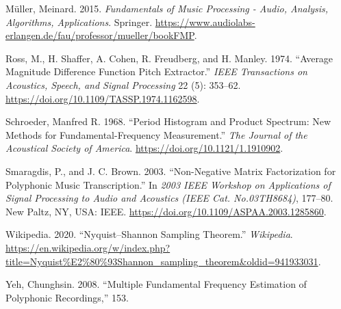 \documentclass[
  american,
]{article}
\newlength{\cslhangindent}
\newenvironment{cslreferences}%
  {\setlength{\parindent}{0pt}%
  \everypar{\setlength{\hangindent}{\cslhangindent}}\ignorespaces}%
  {\par}
\begin{document}
\begin{cslreferences}
\leavevmode\hypertarget{ref-muller_2015}{}%
Müller, Meinard. 2015. \emph{Fundamentals of Music Processing - Audio, Analysis, Algorithms, Applications}. Springer. \url{https://www.audiolabs-erlangen.de/fau/professor/mueller/bookFMP}.

\leavevmode\hypertarget{ref-ross_average_1974}{}%
Ross, M., H. Shaffer, A. Cohen, R. Freudberg, and H. Manley. 1974. ``Average Magnitude Difference Function Pitch Extractor.'' \emph{IEEE Transactions on Acoustics, Speech, and Signal Processing} 22 (5): 353--62. \url{https://doi.org/10.1109/TASSP.1974.1162598}.

\leavevmode\hypertarget{ref-schroeder_period_1968}{}%
Schroeder, Manfred R. 1968. ``Period Histogram and Product Spectrum: New Methods for Fundamental-Frequency Measurement.'' \emph{The Journal of the Acoustical Society of America}. \url{https://doi.org/10.1121/1.1910902}.

\leavevmode\hypertarget{ref-NNMF}{}%
Smaragdis, P., and J. C. Brown. 2003. ``Non-Negative Matrix Factorization for Polyphonic Music Transcription.'' In \emph{2003 IEEE Workshop on Applications of Signal Processing to Audio and Acoustics (IEEE Cat. No.03TH8684)}, 177--80. New Paltz, NY, USA: IEEE. \url{https://doi.org/10.1109/ASPAA.2003.1285860}.

\leavevmode\hypertarget{ref-wiki:nyquistshannon}{}%
Wikipedia. 2020. ``Nyquist--Shannon Sampling Theorem.'' \emph{Wikipedia}. \url{https://en.wikipedia.org/w/index.php?title=Nyquist\%E2\%80\%93Shannon_sampling_theorem\&oldid=941933031}.

\leavevmode\hypertarget{ref-yeh_thesis}{}%
Yeh, Chunghsin. 2008. ``Multiple Fundamental Frequency Estimation of Polyphonic Recordings,'' 153.
\end{cslreferences}
\end{document}

